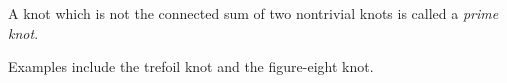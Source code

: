 \documentclass[12pt]{article}
\begin{document}
A knot which is not the connected sum of two nontrivial knots is called
a \emph{prime knot}.

Examples include the trefoil knot and the figure-eight knot.

\end{document}
